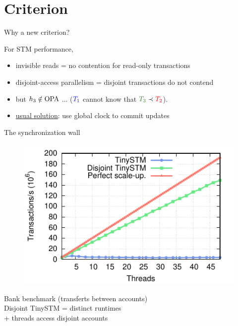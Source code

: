 \section{Criterion}

\begin{frame}{Why a new criterion?}

  For STM performance,
  \begin{itemize}
  \item invisible reads = no contention for read-only transactions
  \item disjoint-access parallelism = disjoint transactions do not contend
  \end{itemize}
  
  \begin{itemize}
  \item but $h_3 \notin \OPA$ ... ($\tOne$ cannot know that $\tThree \hb \tTwo$).
  \item \underline{usual solution}: use global clock to commit updates
  \end{itemize}
\end{frame}

\begin{frame}{The synchronization wall}

  \begin{figure}
    \includegraphics{results/bank-motiv.pdf}
  \end{figure}
  Bank benchmark (transferts between accounts) \\
  Disjoint TinySTM = distinct runtimes \\
  \hspace{8.6em}     + threads access disjoint accounts
\end{frame}

